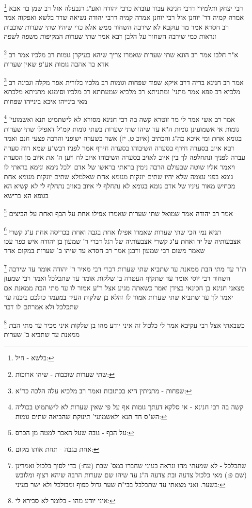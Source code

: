 \documentclass[12pt, openany]{book}
\newcommand{\footnotecomment}[1]{
	\renewcommand\thefootnote{}
	\footnote{#1}}
\newcommand{\commenta}[1]{\footnotecomment{#1}}
\begin{document}
{\commenta{בלשא - חיל:}
רבי יצחק ותלמידי דרבי חנינא עבוד עובדא כרבי יהודה ואע"ג דנבעלה אזל רב שמן בר אבא אמרה קמיה דר' יוחנן אזל רבי יוחנן אמרה קמיה דרבי יהודה נשיאה שדר בלשא ואפקוה 
אמר רב חסדא אמר מר עוקבא לא שירבה השחור ממש אלא כדי שיהיו שתי שערות שוכבות ונראות כמי שירבה השחור על הלבן רבא אמר שתי שערות המקיפות משפה לשפה 
\commenta{שתי שערות שוכבות - שיהו ארוכות:}
א"ר חלבו אמר רב הונא שתי שערות שאמרו צריך שיהא בעיקרן גומות רב מלכיו אמר רב אדא בר אהבה גומות אע"פ שאין שערות 
\commenta{שפחות - מתניתין היא בכתובות ואמר רב מלכיא עלה הלכה כר"א:}
אמר רב חנינא בריה דרב איקא שפוד שפחות וגומות רב מלכיו בלורית אפר מקלה וגבינה רב מלכיא 
רב פפא אמר מתני' ומתניתא רב מלכיא שמעתתא רב מלכיו וסימנא מתניתא מלכתא 
מאי בינייהו איכא בינייהו שפחות 
\commenta{קשה בה רבי חנינא - אי סלקא דעתך גומות אף על פי שאין שערות לא לישתמיט בכוליה הש"ס חד תנא ולאשמועי' תינוקת שהביאה שתים גומות:}
אמר רב אשי אמר לי מר זוטרא קשה בה רבי חנינא מסורא לא לישתמיט תנא ואשמועי' גומות אי אשמועינן גומות ה"א עד שיהו שתי שערות בשתי גומות קמ"ל דאפילו שתי שערות בגומא אחת 
ומי איכא כה"ג והכתיב (איוב ט, יז) אשר בשערה ישופני והרבה פצעי חנם ואמר רבא איוב בסערה חירף בסערה השיבוהו בסערה חירף אמר לפניו רבש"ע שמא רוח סערה עברה לפניך ונתחלפה לך בין איוב לאויב בסערה השיבוהו {איוב לח } ויען ה' את
איוב מן הסערה ויאמר אליו שוטה שבעולם הרבה נימין בראתי בראשו של אדם ולכל נימא ונימא בראתי לו גומא בפני עצמה שלא יהיו שתים יונקות מגומא אחת שאלמלא שתים יונקות מגומא אחת מכחיש מאור עיניו של אדם גומא בגומא לא נתחלף לי איוב באויב נתחלף לי 
לא קשיא הא בגופא הא ברישא 
\commenta{על הכף - גובה שעל האבר למטה מן הכרס:}
אמר רב יהודה אמר שמואל שתי שערות שאמרו אפילו אחת על הכף ואחת על הביצים 
\commenta{אחת בגבה - תחת אותו מקום:}
תניא נמי הכי שתי שערות שאמרו אפילו אחת בגבה ואחת בכריסה אחת ע"ג קשרי אצבעותיה של יד ואחת ע"ג קשרי אצבעותיה של רגל דברי ר' שמעון בן יהודה איש כפר עכו שאמר משום רבי שמעון ורבנן אמר רב חסדא עד שיהו ב' שערות במקום אחד 
\commenta{שתכלכל - לא שמעתי מהו ונראה בעיני שחברו במס' שבת (עח:) כדי לסוך כלכול ואמרינן (שם פ:) מאי כלכול צדעה ובת צדעה ה"נ עד שיהו שם שערות הרבה שיהא רצוף ומלובש בשער. ואני מצאתי עד שתבלבל בבי"ת שער גדול כפוף ומבולבל ולא ישר בעיני:}
ת"ר עד מתי הבת ממאנת עד שתביא שתי שערות דברי רבי מאיר ר' יהודה אומר עד שירבה השחור רבי יוסי אומר עד שתקיף העטרה בן שלקות אומר עד שתכלכל 
ואמר רבי שמעון מצאני חנינא בן חכינאי בצידן ואמר כשאתה מגיע אצל ר"ע אמור לו עד מתי הבת ממאנת אם יאמר לך עד שתביא שתי שערות אמור לו והלא בן שלקות העיד במעמד כולכם ביבנה עד שתכלכל ולא אמרתם לו דבר 
\commenta{איני יודע מהו - כלומר לא סבירא לי:}
כשבאתי אצל רבי עקיבא אמר לי כלכול זה איני יודע מהו בן שלקות איני מכיר עד מתי הבת ממאנת עד שתביא ב' שערות
}
\end{document}
